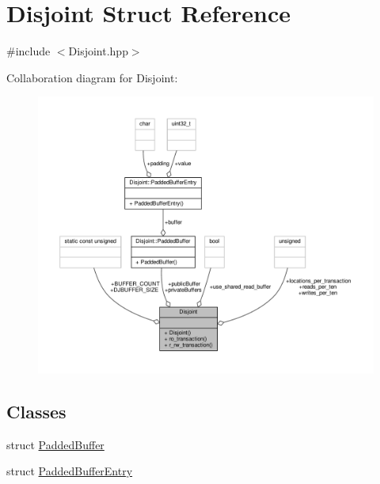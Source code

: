 \hypertarget{structDisjoint}{\section{Disjoint Struct Reference}
\label{structDisjoint}
}


{\ttfamily \#include $<$Disjoint.\-hpp$>$}



Collaboration diagram for Disjoint\-:
\nopagebreak
\begin{figure}[H]
\begin{center}
\leavevmode
\includegraphics[width=350pt]{structDisjoint__coll__graph}
\end{center}
\end{figure}
\subsection*{Classes}
\begin{DoxyCompactItemize}
\item 
struct \hyperlink{structDisjoint_1_1PaddedBuffer}{Padded\-Buffer}
\item 
struct \hyperlink{structDisjoint_1_1PaddedBufferEntry}{Padded\-Buffer\-Entry}
\end{DoxyCompactItemize}

